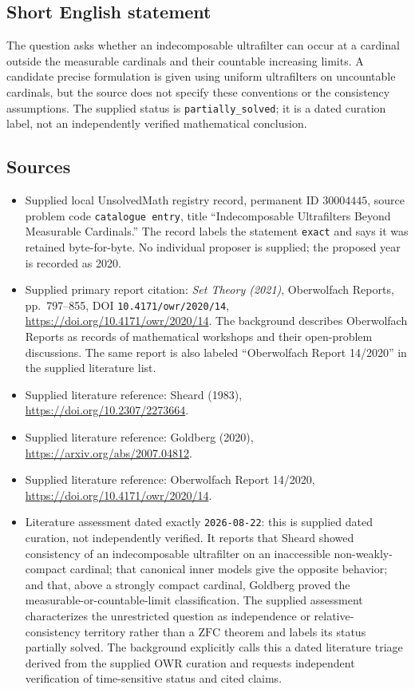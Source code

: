 \documentclass[11pt]{article}
\begin{document}
\subsection{Short English statement}
The question asks whether an indecomposable ultrafilter can occur at a cardinal outside the measurable cardinals and their countable increasing limits. A candidate precise formulation is given using uniform ultrafilters on uncountable cardinals, but the source does not specify these conventions or the consistency assumptions. The supplied status is \texttt{partially\_solved}; it is a dated curation label, not an independently verified mathematical conclusion.
\subsection{Sources}
\begin{itemize}
\item Supplied local UnsolvedMath registry record, permanent ID \(30004445\), source problem code \texttt{catalogue entry}, title ``Indecomposable Ultrafilters Beyond Measurable Cardinals.'' The record labels the statement \texttt{exact} and says it was retained byte-for-byte. No individual proposer is supplied; the proposed year is recorded as 2020.
\item Supplied primary report citation: \emph{Set Theory (2021)}, Oberwolfach Reports, pp.~797--855, DOI \texttt{10.4171/owr/2020/14}, \url{https://doi.org/10.4171/owr/2020/14}. The background describes Oberwolfach Reports as records of mathematical workshops and their open-problem discussions. The same report is also labeled ``Oberwolfach Report 14/2020'' in the supplied literature list.
\item Supplied literature reference: Sheard (1983), \url{https://doi.org/10.2307/2273664}.
\item Supplied literature reference: Goldberg (2020), \url{https://arxiv.org/abs/2007.04812}.
\item Supplied literature reference: Oberwolfach Report 14/2020, \url{https://doi.org/10.4171/owr/2020/14}.
\item Literature assessment dated exactly \texttt{2026-08-22}: this is supplied dated curation, not independently verified. It reports that Sheard showed consistency of an indecomposable ultrafilter on an inaccessible non-weakly-compact cardinal; that canonical inner models give the opposite behavior; and that, above a strongly compact cardinal, Goldberg proved the measurable-or-countable-limit classification. The supplied assessment characterizes the unrestricted question as independence or relative-consistency territory rather than a \(\mathrm{ZFC}\) theorem and labels its status partially solved. The background explicitly calls this a dated literature triage derived from the supplied OWR curation and requests independent verification of time-sensitive status and cited claims.
\end{itemize}
\end{document}
